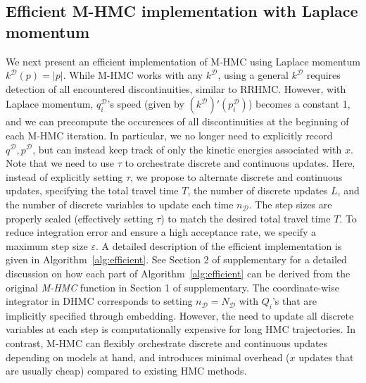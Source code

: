 \documentclass{article}
\newcommand{\cald}{\mathcal{D}}
\begin{document}
\subsection{Efficient M-HMC implementation with Laplace momentum}\label{sec:implementation}



We next present an efficient implementation of M-HMC using Laplace momentum $k^\cald(p)=|p|$. While M-HMC works with any $k^\cald$, using a general $k^\cald$ requires detection of all encountered discontinuities, similar to RRHMC. However, with Laplace momentum, $q^\cald_i$'s speed (given by $(k^{\cald})'(p^\cald_i)$) becomes a constant 1, and we can precompute the occurences of all discontinuities at the beginning of each M-HMC iteration. In particular, we no longer need to explicitly record $q^\cald, p^\cald$, but can instead keep track of only the kinetic energies associated with $x$. Note that we need to use $\tau$ to orchestrate discrete and continuous updates. Here, instead of explicitly setting $\tau$, we propose to alternate discrete and continuous updates, specifying the total travel time $T$, the number of discrete updates $L$, and the number of discrete variables to update each time $n_\cald$. The step sizes are properly scaled (effectively setting $\tau$) to match the desired total travel time $T$. To reduce integration error and ensure a high acceptance rate, we specify a maximum step size $\varepsilon$. A detailed description of the efficient implementation is given in Algorithm~\ref{alg:efficient}. See Section 2 of supplementary for a detailed discussion on how each part of Algorithm~\ref{alg:efficient} can be derived from the original \textit{M-HMC} function in Section 1 of supplementary. The coordinate-wise integrator in DHMC corresponds to setting $n_\cald=N_\cald$ with $Q_i$'s that are implicitly specified through embedding. However, the need to update all discrete variables at each step is computationally expensive for long HMC trajectories. In contrast, M-HMC can flexibly orchestrate discrete and continuous updates depending on models at hand, and introduces minimal overhead ($x$ updates that are usually cheap) compared to existing HMC methods.
\end{document}
